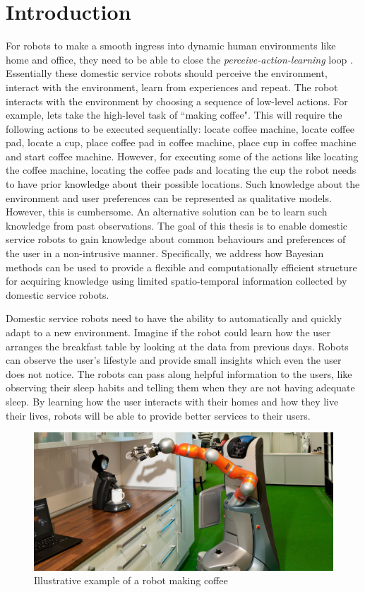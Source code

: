 \chapter{Introduction}
\label{chapter:Introduction}

For robots to make a smooth ingress into dynamic human environments like home and office, they need to be able to close the \emph{perceive-action-learning} loop \citep{Marc2016}. 
Essentially these domestic service robots should perceive the environment, interact with the environment, learn from experiences and repeat. 
The robot interacts with the environment by choosing a sequence of low-level actions. 
For example, lets take the high-level task of ``making coffee". This will require the following actions to be executed sequentially: locate coffee machine, locate coffee pad, locate a cup, place coffee pad in coffee machine, place cup in coffee machine and start coffee machine. 
However, for executing some of the actions like locating the coffee machine, locating the coffee pads and locating the cup the robot needs to have prior knowledge about their possible locations. Such knowledge about the environment and user preferences can be represented as qualitative models. However, this is cumbersome. An alternative solution can be to learn such knowledge from past observations. The goal of this thesis is to enable domestic service robots to gain knowledge about common behaviours and preferences of the user in a non-intrusive manner. Specifically, we address how Bayesian methods can be used to provide a flexible and computationally efficient structure for acquiring knowledge using limited spatio-temporal information collected by domestic service robots.

Domestic service robots need to have the ability to automatically and quickly adapt to a new environment. Imagine if the robot could learn how the user arranges the breakfast table by looking at the data from previous days. Robots can observe the user's lifestyle and provide small insights which even the user does not notice. The robots can pass along helpful information to the users, like observing their sleep habits and telling them when they are not having adequate sleep. By learning how the user interacts with their homes and how they live their lives, robots will be able to provide better services to their users. 
\begin{figure}[htp]
\centering
\includegraphics[width=\textwidth]{images/coffee.jpg}
\caption{Illustrative example of a robot making coffee \citep{bitbotsfb}}
\label{}
\end{figure}

